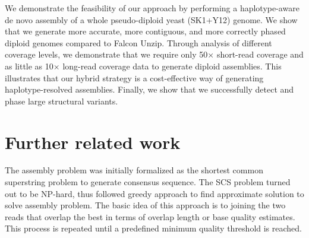 We demonstrate the feasibility of our approach by performing a haplotype-aware de novo assembly of a whole pseudo-diploid yeast (SK1+Y12) genome.
We show that we generate more accurate, more contiguous, and more correctly phased diploid genomes compared to Falcon Unzip.
Through analysis of different coverage levels, we demonstrate that we require only 50$\times$ short-read coverage and as little as 10$\times$ long-read coverage data to generate diploid assemblies.
This illustrates that our hybrid strategy is a cost-effective way of generating haplotype-resolved assemblies.
Finally, we show that we successfully detect and phase large structural variants.



\section{Further related work}
The assembly problem was initially formalized as the shortest common superstring problem \citep{maier1978complexity} to generate consensus sequence.
The SCS problem turned out to be NP-hard, thus \cite{tarhio1988greedy} followed greedy approach to find approximate solution to solve assembly problem.
The basic idea of this approach is to joining the two reads that overlap the best in terms of overlap length or base quality estimates.
This process is repeated until a predefined minimum quality threshold is reached.

